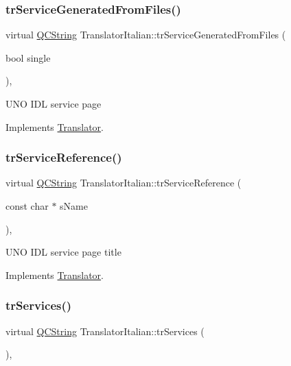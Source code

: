\subsubsection{\texorpdfstring{trServiceGeneratedFromFiles()}{trServiceGeneratedFromFiles()}}
{\footnotesize\ttfamily virtual \mbox{\hyperlink{class_q_c_string}{Q\+C\+String}} Translator\+Italian\+::tr\+Service\+Generated\+From\+Files (\begin{DoxyParamCaption}\item[{bool}]{single }\end{DoxyParamCaption})\hspace{0.3cm}{\ttfamily [inline]}, {\ttfamily [virtual]}}

U\+NO I\+DL service page 

Implements \mbox{\hyperlink{class_translator}{Translator}}.

\mbox{\label{class_translator_italian_a239b2cf098864a4232a87fe148de64e5}} 
\subsubsection{\texorpdfstring{trServiceReference()}{trServiceReference()}}
{\footnotesize\ttfamily virtual \mbox{\hyperlink{class_q_c_string}{Q\+C\+String}} Translator\+Italian\+::tr\+Service\+Reference (\begin{DoxyParamCaption}\item[{const char $\ast$}]{s\+Name }\end{DoxyParamCaption})\hspace{0.3cm}{\ttfamily [inline]}, {\ttfamily [virtual]}}

U\+NO I\+DL service page title 

Implements \mbox{\hyperlink{class_translator}{Translator}}.

\mbox{\label{class_translator_italian_ab801dd0563df15870ced24814b437cff}} 
\subsubsection{\texorpdfstring{trServices()}{trServices()}}
{\footnotesize\ttfamily virtual \mbox{\hyperlink{class_q_c_string}{Q\+C\+String}} Translator\+Italian\+::tr\+Services (\begin{DoxyParamCaption}{ }\end{DoxyParamCaption})\hspace{0.3cm}{\ttfamily [inline]}, {\ttfamily [virtual]}}

